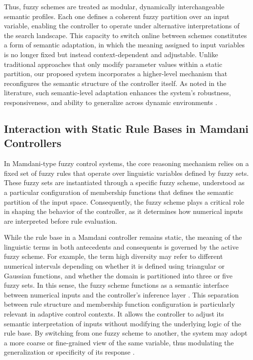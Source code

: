 Thus, fuzzy schemes are treated as modular, dynamically interchangeable semantic profiles. Each one defines a coherent fuzzy partition over an input variable, enabling the controller to operate under alternative interpretations of the search landscape. This capacity to switch online between schemes constitutes a form of semantic adaptation, in which the meaning assigned to input variables is no longer fixed but instead context-dependent and adjustable. Unlike traditional approaches that only modify parameter values within a static partition, our proposed system incorporates a higher-level mechanism that reconfigures the semantic structure of the controller itself. As noted in the literature, such semantic-level adaptation enhances the system’s robustness, responsiveness, and ability to generalize across dynamic environments \parencite{wang2023fuzzy, castillo2018generalized}.


\subsection{Interaction with Static Rule Bases in Mamdani Controllers}
In Mamdani-type fuzzy control systems, the core reasoning mechanism relies on a fixed set of fuzzy rules that operate over linguistic variables defined by fuzzy sets. These fuzzy sets are instantiated through a specific fuzzy scheme, understood as a particular configuration of membership functions that defines the semantic partition of the input space. Consequently, the fuzzy scheme plays a critical role in shaping the behavior of the controller, as it determines how numerical inputs are interpreted before rule evaluation.

While the rule base in a Mamdani controller remains static, the meaning of the linguistic terms in both antecedents and consequents is governed by the active fuzzy scheme. For example, the term high diversity may refer to different numerical intervals depending on whether it is defined using triangular or Gaussian functions, and whether the domain is partitioned into three or five fuzzy sets. In this sense, the fuzzy scheme functions as a semantic interface between numerical inputs and the controller’s inference layer \parencite{dombi2021modifiers}.
This separation between rule structure and membership function configuration is particularly relevant in adaptive control contexts. It allows the controller to adjust its semantic interpretation of inputs without modifying the underlying logic of the rule base. By switching from one fuzzy scheme to another, the system may adopt a more coarse or fine-grained view of the same variable, thus modulating the generalization or specificity of its response \parencite{sadollah2018introductory, pedrycz2015designing}.

